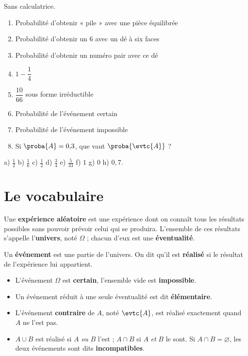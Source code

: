 \begin{automatismes}
Sans calculatrice.

\begin{enumerate}[label=\textbf{\alph*)}, leftmargin=*, itemsep=0.25em]
  \item Probabilité d'obtenir « pile » avec une pièce équilibrée
  \item Probabilité d'obtenir un $6$ avec un dé à six faces
  \item Probabilité d'obtenir un numéro pair avec ce dé
  \item $1-\dfrac{1}{4}$
  \item $\dfrac{10}{66}$ sous forme irréductible
  \item Probabilité de l'événement certain
  \item Probabilité de l'événement impossible
  \item Si $\proba{A} = 0{,}3$, que vaut $\proba{\evtc{A}}$ ?
\end{enumerate}
\end{automatismes}

\begin{corrige}[automatismes]
a) $\frac12$ \quad b) $\frac16$ \quad c) $\frac12$ \quad d) $\frac34$ \quad
e) $\frac{5}{33}$ \quad f) $1$ \quad g) $0$ \quad h) $0{,}7$.
\end{corrige}

\section{Le vocabulaire}

\begin{definition}
Une \textbf{expérience aléatoire} est une expérience dont on connaît tous
les résultats possibles sans pouvoir prévoir celui qui se produira.
L'ensemble de ces résultats s'appelle l'\textbf{univers}, noté $\Omega$ ;
chacun d'eux est une \textbf{éventualité}.
\end{definition}

\begin{definition}[événement]
Un \textbf{événement} est une partie de l'univers. On dit qu'il est
\textbf{réalisé} si le résultat de l'expérience lui appartient.
\begin{itemize}[leftmargin=1.3em, itemsep=0.12em]
  \item L'événement $\Omega$ est \textbf{certain}, l'ensemble vide est
        \textbf{impossible}.
  \item Un événement réduit à une seule éventualité est dit
        \textbf{élémentaire}.
  \item L'événement \textbf{contraire} de $A$, noté $\evtc{A}$, est réalisé
        exactement quand $A$ ne l'est pas.
  \item $A \cup B$ est réalisé si $A$ \emph{ou} $B$ l'est ; $A \cap B$ si
        $A$ \emph{et} $B$ le sont. Si $A \cap B = \varnothing$, les deux
        événements sont dits \textbf{incompatibles}.
\end{itemize}
\end{definition}

